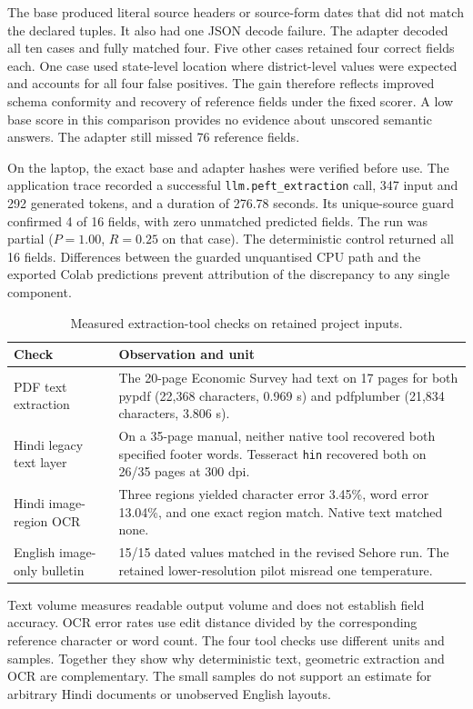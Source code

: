 \documentclass[11pt,a4paper]{article}
\newcommand{\code}[1]{\texttt{#1}}
\begin{document}
The base produced literal source headers or source-form dates that did not match the declared tuples. It also had one JSON decode failure. The adapter decoded all ten cases and fully matched four. Five other cases retained four correct fields each. One case used state-level location where district-level values were expected and accounts for all four false positives. The gain therefore reflects improved schema conformity and recovery of reference fields under the fixed scorer. A low base score in this comparison provides no evidence about unscored semantic answers. The adapter still missed 76 reference fields.

On the laptop, the exact base and adapter hashes were verified before use. The application trace recorded a successful \code{llm.peft\_extraction} call, 347 input and 292 generated tokens, and a duration of 276.78 seconds. Its unique-source guard confirmed 4 of 16 fields, with zero unmatched predicted fields. The run was partial (\(P=1.00\), \(R=0.25\) on that case). The deterministic control returned all 16 fields. Differences between the guarded unquantised CPU path and the exported Colab predictions prevent attribution of the discrepancy to any single component.

\begin{table}[!ht]
\small
\caption{Measured extraction-tool checks on retained project inputs.}
\begin{tabularx}{\linewidth}{@{}P{.31\linewidth}Y@{}}
\toprule
Check & Observation and unit\\ \midrule
PDF text extraction & The 20-page Economic Survey had text on 17 pages for both pypdf (22,368 characters, 0.969 s) and pdfplumber (21,834 characters, 3.806 s).\\
Hindi legacy text layer & On a 35-page manual, neither native tool recovered both specified footer words. Tesseract \code{hin} recovered both on 26/35 pages at 300 dpi.\\
Hindi image-region OCR & Three regions yielded character error 3.45\%, word error 13.04\%, and one exact region match. Native text matched none.\\
English image-only bulletin & 15/15 dated values matched in the revised Sehore run. The retained lower-resolution pilot misread one temperature.\\
\bottomrule
\end{tabularx}
\end{table}

Text volume measures readable output volume and does not establish field accuracy. OCR error rates use edit distance divided by the corresponding reference character or word count. The four tool checks use different units and samples. Together they show why deterministic text, geometric extraction and OCR are complementary. The small samples do not support an estimate for arbitrary Hindi documents or unobserved English layouts.
\end{document}
